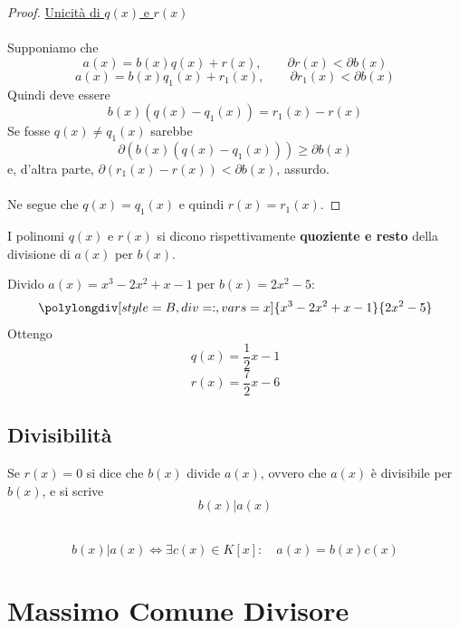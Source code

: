 \documentclass[a4paper,12pt, oneside]{book}
\begin{document}
\begin{teorema}
\begin{proof}
				\underline{Unicità di $q(x)$ e $r(x)$}\\\\
					Supponiamo che
					$$a(x) = b(x)q(x) + r(x), \qquad \partial r(x) < \partial b(x)$$
					$$a(x) = b(x)q_1(x) + r_1(x), \qquad \partial r_1(x) < \partial b(x)$$
					Quindi deve essere
					$$b(x) ( q(x) - q_1(x) ) = r_1(x) - r(x)$$
					Se fosse $q(x) \not = q_1(x)$ sarebbe 
					$$\partial ( b(x)  ( q(x) - q_1(x) )) \geq \partial b(x)$$
					e, d'altra parte, $\partial ( r_1(x) -r(x) ) < \partial b(x)$, assurdo.\\\\
					Ne segue che $q(x) = q_1(x)$ e quindi $r(x) = r_1(x)$.
			\end{proof}
		\end{teorema}
		
		\begin{definizione}
			I polinomi $q(x)$ e $r(x)$ si dicono rispettivamente \textbf{quoziente e resto} della divisione di $a(x)$ per $b(x)$.
		\end{definizione}
				
		\begin{shaded}
			\begin{esempio}
				Divido $a(x)=x^3-2x^2+x-1$ per $b(x)=2x^2-5$:
				$$\polylongdiv[style=B,div=:,vars=x]{x^3-2x^2+x-1}{2x^2-5}$$
				Ottengo $$q(x)=\frac{1}{2}x-1$$ $$r(x)=\frac{7}{2}x-6$$
			\end{esempio}
			

		\end{shaded}
		
		\subsection{Divisibilità}
		
			\begin{definizione}[Divisibilità]
				Se $r(x) = 0$ si dice che $b(x)$ divide $a(x)$, ovvero che $a(x)$ è divisibile per $b(x)$, e si scrive $$b(x) | a(x)$$\\
				\begin{nota}
					$$b(x) | a(x) \iff \exists c(x) \in K[x]: \quad a(x)=b(x)c(x)$$
				\end{nota}
			\end{definizione}
			
	\section{Massimo Comune Divisore}
		
\end{document}
